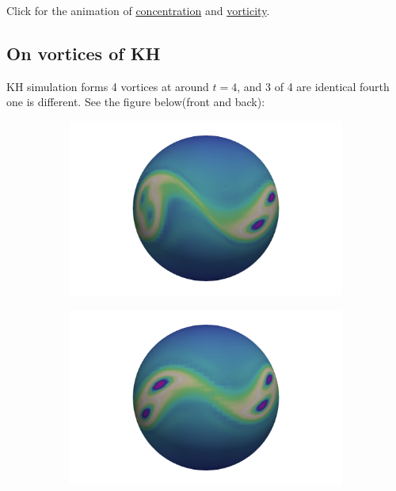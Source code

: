 \documentclass{article}
\begin{document}
Click for the animation of \href{https://www.dropbox.com/s/efymgjo6drifeoj/KH-concentration-l5-lt1e3-lmyes-ltyes.avi?dl=0}{concentration} and \href{https://www.dropbox.com/s/mtjzgtt2ec7nuzj/KH-vorticity-l5-lt1e3-lmyes-ltyes.avi?dl=0}{vorticity}.

\subsection{On vortices of KH}
KH simulation forms 4 vortices at around $t=4$, and 3 of 4 are identical fourth one is different. See the figure below(front and back):
\begin{figure}[h]
	\centering
	\begin{subfigure}[b]{0.15\textwidth}
		\includegraphics[scale=0.1]{images/KHvorticity1.png}
		
	\end{subfigure} 
	\begin{subfigure}[b]{0.15\textwidth}
		\includegraphics[scale=0.1]{images/KHvorticity2.png}
		
	\end{subfigure}
	
\end{figure}
\end{document}

